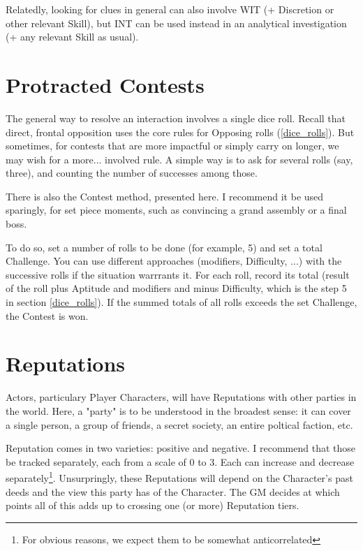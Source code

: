 Relatedly, looking for clues in general can also involve WIT (+ Discretion or other relevant Skill), but INT can be used instead in an analytical investigation (+ any relevant Skill as usual).


\section{Protracted Contests}
\label{protracted}

The general way to resolve an interaction involves a single dice roll. Recall that direct, frontal opposition uses the core rules for Opposing rolls (\ref{dice_rolls}). But sometimes, for contests that are more impactful or simply carry on longer, we may wish for a more... involved rule. A simple way is to ask for several rolls (say, three), and counting the number of successes among those.

There is also the Contest method, presented here. I recommend it be used sparingly, for set piece moments, such as convincing a grand assembly or a final boss. 

To do so, set a number of rolls to be done (for example, 5) and set a total Challenge. You can use different approaches (modifiers, Difficulty, ...) with the successive rolls if the situation warrrants it. For each roll, record its total (result of the roll plus Aptitude and modifiers and minus Difficulty, which is the step 5 in section \ref{dice_rolls}). If the summed totals of all rolls exceeds the set Challenge, the Contest is won.


\section{Reputations}

\label{reputations}

Actors, particulary Player Characters, will have Reputations with other parties in the world. Here, a "party" is to be understood in the broadest sense: it can cover a single person, a group of friends, a secret society, an entire poltical faction, etc.

Reputation comes in two varieties: positive and negative. I recommend that those be tracked separately, each from a scale of 0 to 3. Each can increase and decrease separately\footnote{For obvious reasons, we expect them to be somewhat anticorrelated}. Unsurpringly, these Reputations will depend on the Character's past deeds and the view this party has of the Character. The GM decides at which points all of this adds up to crossing one (or more) Reputation tiers.

